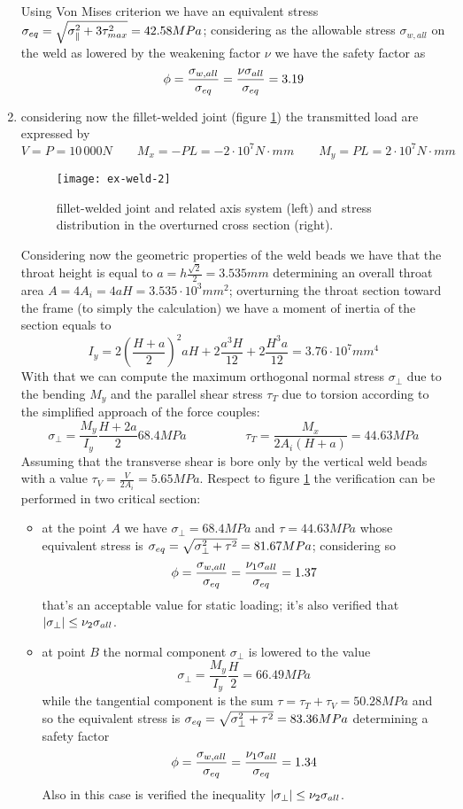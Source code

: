 \begin{enumerate}
	Using Von Mises criterion we have an equivalent stress $\sigma_{eq} = \sqrt{\sigma_\parallel^2 + 3 \tau_{max}^2} = 42.58 MPa$; considering as the allowable stress $\sigma_{w,all}$ on the weld as lowered by the weakening factor $\nu$ we have the safety factor as
	\[ \phi = \frac{\sigma_{w,all}}{\sigma_{eq}} = \frac{\nu \sigma_{all}}{\sigma_{eq}} = 3.19 \]
	
	\item considering now the fillet-welded joint (figure \ref{ex:weld2}) the transmitted load are expressed by
	\[ V = P = 10\,000N \qquad M_x = - PL = -2\cdot 10^7 N\cdot mm \qquad M_y = PL = 2 \cdot 10^7 N\cdot mm\]
	
	\begin{figure}[b]
		\centering \texttt{[image: ex-weld-2]} 
		\caption{fillet-welded joint and related axis system (left) and stress distribution in the overturned cross section (right).} \label{ex:weld2}
	\end{figure}
	
	Considering now the geometric properties of the weld beads we have that the throat height is equal to $ a = h \frac{\sqrt 2}{2} = 3.535mm$ determining an overall throat area $A = 4 A_i = 4 aH = 3.535\cdot 10^3mm^2$; overturning the throat section toward the frame (to simply the calculation) we have a moment of inertia of the section equals to
	\[ I_y = 2 \left(\frac{H+a}{2}\right)^2 a H + 2 \frac{a^3H}{12} + 2 \frac{H^3 a}{12} = 3.76 \cdot 10^7 mm^4  \]
	With that we can compute the maximum orthogonal normal stress $\sigma_\perp$ due to the bending $M_y$ and the parallel shear stress $\tau_T$ due to torsion according to the simplified approach of the force couples:
	\[ \sigma_\perp = \frac{M_y}{I_y} \frac{H+2a}{2} 68.4MPa \hspace{2cm} \tau_T = \frac{M_x}{2 A_i (H+a)} = 44.63 MPa \]
	Assuming that the transverse shear is bore only by the vertical weld beads with a value $\tau_V= \frac{V}{2 A_i} = 5.65 MPa$. Respect to figure \ref{ex:weld2} the verification can be performed in two critical section:
	\begin{itemize}
		\item at the point $A$ we have $\sigma_\perp = 68.4 MPa$ and $\tau= 44.63MPa$ whose equivalent stress is $\sigma_{eq} = \sqrt{\sigma_\perp^2 + \tau^2} = 81.67 MPa$; considering so
		\[ \phi = \frac{\sigma_{w,all}}{\sigma_{eq}} = \frac{\nu_1 \sigma_{all}}{\sigma_{eq}} = 1.37 \]
		that's an acceptable value for static loading; it's also verified that $|\sigma_\perp| \leq \nu_2 \sigma_{all}$.
		\item at point $B$ the normal component $\sigma_\perp$ is lowered to the value
		\[ \sigma_\perp = \frac{M_y}{I_y} \frac H 2 = 66.49 MPa \]
		while the tangential component is the sum $\tau = \tau_T + \tau_V= 50.28 MPa$ and so the equivalent stress is $\sigma_{eq} = \sqrt{\sigma_\perp^2 + \tau^2} = 83.36 MPa$ determining a safety factor
		\[ \phi = \frac{\sigma_{w,all}}{\sigma_{eq}} = \frac{\nu_1 \sigma_{all}}{\sigma_{eq}} = 1.34 \]
		Also in this case is verified the inequality $|\sigma_\perp| \leq \nu_2 \sigma_{all}$.
	\end{itemize}
	

\end{enumerate}
